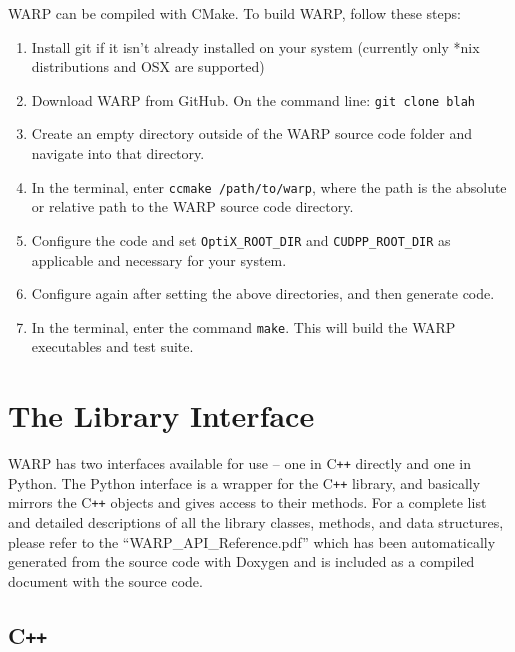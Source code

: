 \documentclass[twoside,a4paper]{refart}
\begin{document}
WARP can be compiled with CMake. To build WARP, follow these steps:

\begin{enumerate}
\item{Install git if it isn't already installed on your system (currently only *nix distributions and OSX are supported)}
\item{Download WARP from GitHub.  On the command line: \texttt{git clone blah} }
\item{Create an empty directory outside of the WARP source code folder and navigate into that directory.}
\item{In the terminal, enter \texttt{ccmake /path/to/warp}, where the path is the absolute or relative 
path to the WARP source code directory.}
\item{Configure the code and set \texttt{OptiX\_ROOT\_DIR} and \texttt{CUDPP\_ROOT\_DIR} as applicable
and necessary for your system.}
\item{Configure again after setting the above directories, and then generate code.}
\item{In the terminal, enter the command \texttt{make}. This will build the WARP executables and test 
suite.}
\end{enumerate}

\section{The Library Interface}

WARP has two interfaces available for use -- one in C\texttt{++} directly and one in Python.  The Python 
interface is a wrapper for the C\texttt{++} library, and basically mirrors the C\texttt{++} objects and gives access to their methods.  For
a complete list and detailed descriptions of all the library classes, methods, and data structures, please
refer to the ``WARP\_API\_Reference.pdf'' which has been automatically generated from the source code with
Doxygen and is included as a compiled document with the source code.

\subsection{C\texttt{++}}
\end{document}
